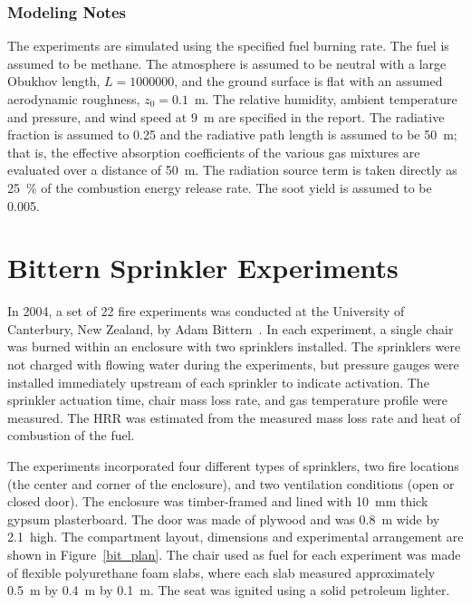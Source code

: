 \subsubsection{Modeling Notes}

The experiments are simulated using the specified fuel burning rate. The fuel is assumed to be methane. The atmosphere is assumed to be neutral with a large Obukhov length, $L=1000000$, and the ground surface is flat with an assumed aerodynamic roughness, $z_0=0.1$~m. The relative humidity, ambient temperature and pressure, and wind speed at 9~m are specified in the report. The radiative fraction is assumed to 0.25 and the radiative path length is assumed to be 50~m; that is, the effective absorption coefficients of the various gas mixtures are evaluated over a distance of 50~m. The radiation source term is taken directly as 25~\% of the combustion energy release rate. The soot yield is assumed to be 0.005.



\section{Bittern Sprinkler Experiments}
\label{Bittern_Sprinkler_Description}

In 2004, a set of 22 fire experiments was conducted at the University of Canterbury, New Zealand, by Adam Bittern~\cite{Bittern:Thesis,Wade:FT2007}. In each experiment, a single chair was burned within an enclosure with two sprinklers installed. The sprinklers were not charged with flowing water during the experiments, but pressure gauges were installed immediately upstream of each sprinkler to indicate activation. The sprinkler actuation time, chair mass loss rate, and gas temperature profile were measured. The HRR was estimated from the measured mass loss rate and heat of combustion of the fuel.

The experiments incorporated four different types of sprinklers, two fire locations (the center and corner of the enclosure), and two ventilation conditions (open or closed door). The enclosure was timber-framed and lined with 10~mm thick gypsum plasterboard. The door was made of plywood and was 0.8~m wide by 2.1~high. The compartment layout, dimensions and experimental arrangement are shown in Figure~\ref{bit_plan}. The chair used as fuel for each experiment was made of flexible polyurethane foam slabs, where each slab measured approximately 0.5~m by 0.4~m by 0.1~m. The seat was ignited using a solid petroleum lighter.

